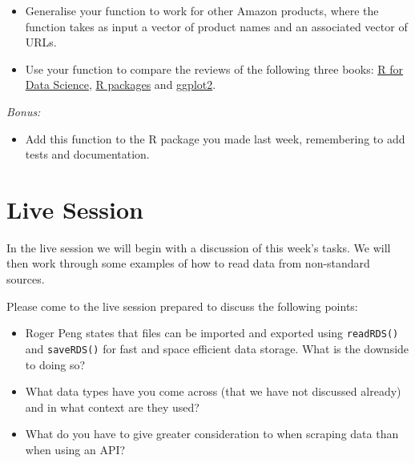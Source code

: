 \documentclass[
  letterpaper,
  DIV=11,
  numbers=noendperiod]{scrreprt}
\providecommand{\tightlist}{%
  \setlength{\itemsep}{0pt}\setlength{\parskip}{0pt}}\usepackage{longtable,booktabs,array}
\begin{document}
\begin{itemize}
\item
  Generalise your function to work for other Amazon products, where the
  function takes as input a vector of product names and an associated
  vector of URLs.
\item
  Use your function to compare the reviews of the following three books:
  \href{https://www.amazon.com/Data-Science-Transform-Visualize-Model/dp/1491910399/ref=sr_1_1?keywords=r+for+data+science&qid=1674145765&s=books&sprefix=R+for+data+\%2Cstripbooks-intl-ship\%2C157&sr=1-1}{R
  for Data Science},
  \href{https://www.amazon.com/Packages-Organize-Test-Document-Share/dp/1491910593/ref=sr_1_1?crid=XWR8O7WPKZS9&keywords=R+packages&qid=1674145743&s=books&sprefix=r+package\%2Cstripbooks-intl-ship\%2C158&sr=1-1}{R
  packages} and
  \href{https://www.amazon.com/ggplot2-Elegant-Graphics-Data-Analysis/dp/331924275X/ref=sr_1_1?crid=24WRUZ93PL2E6&keywords=ggplot2&qid=1674145703&s=books&sprefix=ggplot2\%2Cstripbooks-intl-ship\%2C190&sr=1-1}{ggplot2}.
\end{itemize}

\emph{Bonus:}

\begin{itemize}
\tightlist
\item
  Add this function to the R package you made last week, remembering to
  add tests and documentation.
\end{itemize}

\section*{Live Session}\label{live-session-1}


In the live session we will begin with a discussion of this week's
tasks. We will then work through some examples of how to read data from
non-standard sources.

Please come to the live session prepared to discuss the following
points:

\begin{itemize}
\item
  Roger Peng states that files can be imported and exported using
  \texttt{readRDS()} and \texttt{saveRDS()} for fast and space efficient
  data storage. What is the downside to doing so?
\item
  What data types have you come across (that we have not discussed
  already) and in what context are they used?
\item
  What do you have to give greater consideration to when scraping data
  than when using an API?
\end{itemize}
\end{document}
